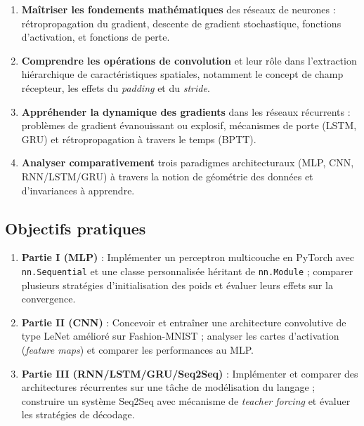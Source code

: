 \documentclass[11pt,a4paper]{article}
\begin{document}
\begin{enumerate}
  \item \textbf{Maîtriser les fondements mathématiques} des réseaux de neurones :
        rétropropagation du gradient, descente de gradient stochastique, fonctions
        d'activation, et fonctions de perte.
  \item \textbf{Comprendre les opérations de convolution} et leur rôle dans l'extraction
        hiérarchique de caractéristiques spatiales, notamment le concept de champ récepteur,
        les effets du \textit{padding} et du \textit{stride}.
  \item \textbf{Appréhender la dynamique des gradients} dans les réseaux récurrents :
        problèmes de gradient évanouissant ou explosif, mécanismes de porte (LSTM, GRU)
        et rétropropagation à travers le temps (BPTT).
  \item \textbf{Analyser comparativement} trois paradigmes architecturaux (MLP, CNN, RNN/LSTM/GRU)
        à travers la notion de géométrie des données et d'invariances à apprendre.
\end{enumerate}

\subsection{Objectifs pratiques}

\begin{enumerate}
  \item \textbf{Partie I (MLP)} : Implémenter un perceptron multicouche en PyTorch avec
        \texttt{nn.Sequential} et une classe personnalisée héritant de \texttt{nn.Module} ;
        comparer plusieurs stratégies d'initialisation des poids et évaluer leurs effets
        sur la convergence.
  \item \textbf{Partie II (CNN)} : Concevoir et entraîner une architecture convolutive
        de type LeNet amélioré sur Fashion-MNIST ; analyser les cartes d'activation
        (\textit{feature maps}) et comparer les performances au MLP.
  \item \textbf{Partie III (RNN/LSTM/GRU/Seq2Seq)} : Implémenter et comparer des architectures
        récurrentes sur une tâche de modélisation du langage ; construire un système
        Seq2Seq avec mécanisme de \textit{teacher forcing} et évaluer les stratégies de décodage.
\end{enumerate}

\end{document}
